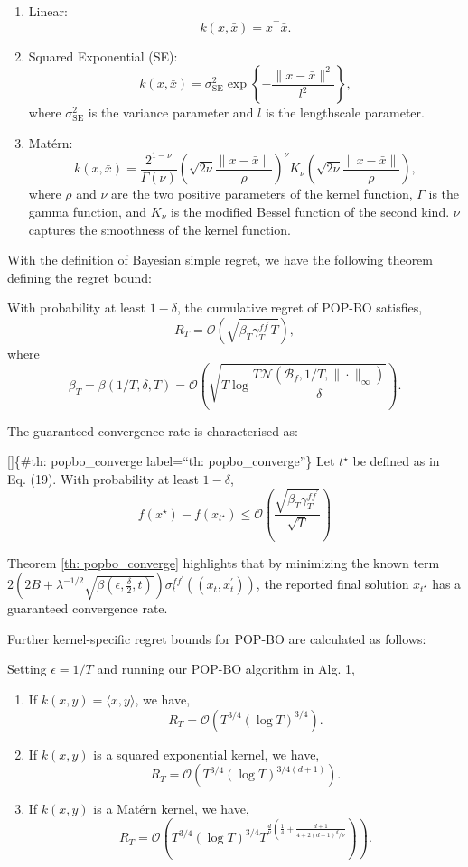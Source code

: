 \documentclass[
  letterpaper,
  DIV=11,
  numbers=noendperiod,
  oneside]{scrreprt}
\theoremstyle{remark}
\begin{document}
\begin{enumerate}
\def\labelenumi{\arabic{enumi}.}
\item
  Linear: \[k(x, \bar{x})=x^{\top} \bar{x} .\]
\item
  Squared Exponential (SE):
  \[k(x, \bar{x})=\sigma_{\mathrm{SE}}^2 \exp \left\{-\frac{\|x-\bar{x}\|^2}{l^2}\right\},\]
  where \(\sigma_{\mathrm{SE}}^2\) is the variance parameter and \(l\)
  is the lengthscale parameter.
\item
  Matérn:
  \[k(x, \bar{x})=\frac{2^{1-\nu}}{\Gamma(\nu)}\left(\sqrt{2 \nu} \frac{\|x-\bar{x}\|}{\rho}\right)^\nu K_\nu\left(\sqrt{2 \nu} \frac{\|x-\bar{x}\|}{\rho}\right),\]
  where \(\rho\) and \(\nu\) are the two positive parameters of the
  kernel function, \(\Gamma\) is the gamma function, and \(K_\nu\) is
  the modified Bessel function of the second kind. \(\nu\) captures the
  smoothness of the kernel function.
\end{enumerate}

With the definition of Bayesian simple regret, we have the following
theorem defining the regret bound:

With probability at least \(1-\delta\), the cumulative regret of POP-BO
satisfies,
\[R_T=\mathcal{O}\left(\sqrt{\beta_T \gamma_T^{f f^{\prime}} T}\right),\]
where
\[\beta_T=\beta(1 / T, \delta, T)=\mathcal{O}\left(\sqrt{T \log \frac{T \mathcal{N}\left(\mathcal{B}_f, 1 / T,\|\cdot\|_{\infty}\right)}{\delta}}\right).\]

The guaranteed convergence rate is characterised as:

{[}{]}\{\#th: popbo\_converge label=``th: popbo\_converge''\} Let
\(t^{\star}\) be defined as in Eq. (19). With probability at least
\(1-\delta\),
\[f\left(x^{\star}\right)-f\left(x_{t^{\star}}\right) \leq \mathcal{O}\left(\frac{\sqrt{\beta_T \gamma_T^{f f^{\prime}}}}{\sqrt{T}}\right)\]

Theorem \hyperref[th:ux5cux2520popbo_converge]{{[}th:
popbo\_converge{]}} highlights that by minimizing the known term
\(2\left(2 B+\lambda^{-1 / 2} \sqrt{\beta\left(\epsilon, \frac{\delta}{2}, t\right)}\right) \sigma_t^{f f^{\prime}}\left(\left(x_t, x_t^{\prime}\right)\right)\),
the reported final solution \(x_{t^{\star}}\) has a guaranteed
convergence rate.

Further kernel-specific regret bounds for POP-BO are calculated as
follows:

Setting \(\epsilon=1 / T\) and running our POP-BO algorithm in Alg. 1,

\begin{enumerate}
\def\labelenumi{\arabic{enumi}.}
\item
  If \(k(x, y)=\langle x, y\rangle\), we have,
  \[R_T=\mathcal{O}\left(T^{3 / 4}(\log T)^{3 / 4}\right) .\]
\item
  If \(k(x, y)\) is a squared exponential kernel, we have,
  \[R_T=\mathcal{O}\left(T^{3 / 4}(\log T)^{3 / 4(d+1)}\right) .\]
\item
  If \(k(x, y)\) is a Matérn kernel, we have,
  \[\left.R_T=\mathcal{O}\left(T^{3 / 4}(\log T)^{3 / 4} T^{\frac{d}{\nu}\left(\frac{1}{4}+\frac{d+1}{4+2(d+1)^d / \nu}\right.}\right)\right).\]
\end{enumerate}
\end{document}
